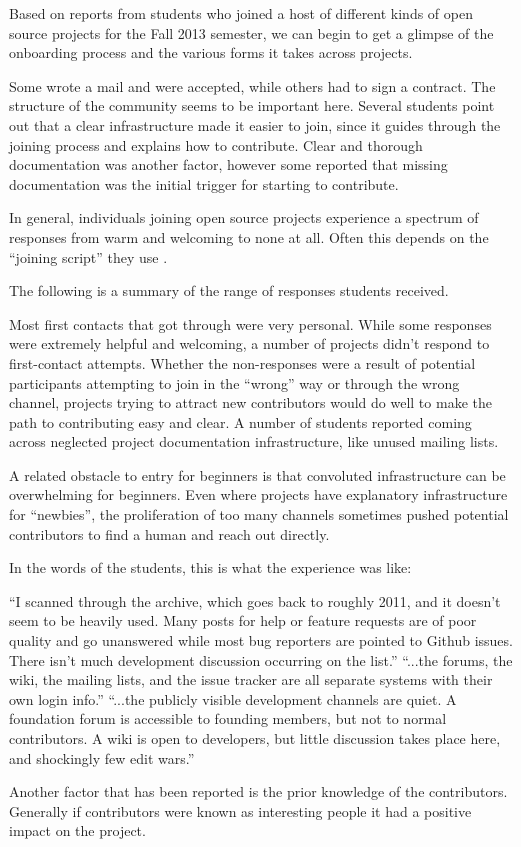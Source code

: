 Based on reports from students who joined a host of different kinds of open source projects for the Fall 2013 semester, we can begin to get a glimpse of the onboarding process and the various forms it takes across projects. 

Some wrote a mail and were accepted, while others had to sign a contract. The structure of the community seems to be important here. Several students point out that a clear infrastructure made it easier to join, since it guides through the joining process and explains how to contribute. Clear and thorough documentation was another factor, however some reported that missing documentation was the initial trigger for starting to contribute.

In general, individuals joining open source projects experience a spectrum of responses from warm and welcoming to none at all. Often this depends on the “joining script” they use \cite{vonKrogh2013}. 

The following is a summary of the range of responses students received. 

Most first contacts that got through were very personal. While some responses were extremely helpful and welcoming, a number of projects didn’t respond to first-contact attempts. Whether the non-responses were a result of potential participants attempting to join in the ``wrong'' way or through the wrong channel, projects trying to attract new contributors would do well to make the path to contributing easy and clear. A number of students reported coming across neglected project documentation infrastructure, like unused mailing lists. 

A related obstacle to entry for beginners is that convoluted infrastructure can be overwhelming for beginners. Even where projects have explanatory infrastructure for ``newbies'', the proliferation of too many channels sometimes pushed potential contributors to find a human and reach out directly. 

In the words of the students, this is what the experience was like:

``I scanned through the archive, which goes back to roughly 2011, and it doesn’t seem to be heavily used. Many posts for help or feature requests are of poor quality and go unanswered while most bug reporters are pointed to Github issues. There isn’t much development discussion occurring on the list.'' 
``...the forums, the wiki, the mailing lists, and the issue tracker are all separate systems with their own login info.''
``...the publicly visible development channels are quiet. A foundation forum is accessible to founding members, but not to normal contributors. A wiki is open to developers, but little discussion takes place here, and shockingly few edit wars.''

Another factor that has been reported is the prior knowledge of the contributors. Generally if contributors were known as interesting people it had a positive impact on the project.

